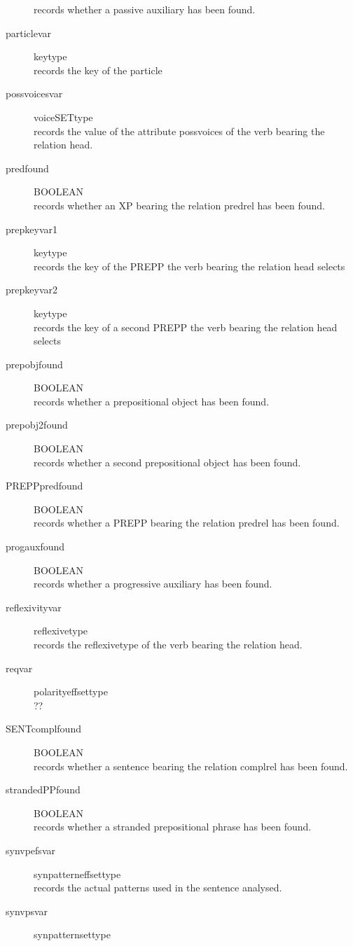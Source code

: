 \begin{description}
records whether a passive auxiliary has been found.
\item [particlevar        ] keytype\\
records the key of the particle
\item [possvoicesvar      ] voiceSETtype\\
records the value of the attribute possvoices of the verb bearing the relation head.
\item [predfound          ] BOOLEAN\\
records whether an XP bearing the relation predrel has been found.
\item [prepkeyvar1        ] keytype\\
records the key of the PREPP the verb bearing the relation head selects
\item [prepkeyvar2        ] keytype\\
records the key of a second PREPP the verb bearing the relation head selects
\item [prepobjfound       ] BOOLEAN\\
records whether a prepositional object has been found.
\item [prepobj2found      ] BOOLEAN\\
records whether a second prepositional object has been found.
\item [PREPPpredfound     ] BOOLEAN\\
records whether a PREPP bearing the relation predrel has been found.
\item [progauxfound       ] BOOLEAN\\
records whether a progressive auxiliary has been found.
\item [reflexivityvar     ] reflexivetype\\
records the reflexivetype of the verb bearing the relation head.
\item [reqvar             ] polarityeffsettype\\
??
\item [SENTcomplfound     ] BOOLEAN\\
records whether a sentence bearing the relation complrel has been found.
\item [strandedPPfound    ] BOOLEAN\\
records whether a stranded prepositional phrase has been found.
\item [synvpefsvar        ] synpatterneffsettype\\
records the actual patterns used in the sentence analysed.
\item [synvpsvar          ] synpatternsettype\\

\end{description}
